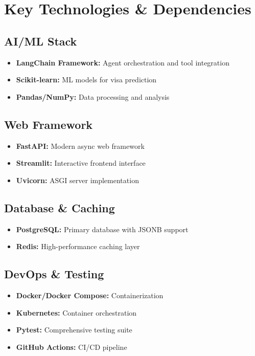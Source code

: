 \documentclass[11pt,a4paper]{article}
\newcommand{\tech}[1]{\textbf{#1}}
\begin{document}
\newpage
\section{Key Technologies \& Dependencies}

\subsection{AI/ML Stack}
\begin{itemize}[itemsep=0.2em]
    \item \tech{LangChain Framework:} Agent orchestration and tool integration
    \item \tech{Scikit-learn:} ML models for visa prediction
    \item \tech{Pandas/NumPy:} Data processing and analysis
\end{itemize}

\subsection{Web Framework}
\begin{itemize}[itemsep=0.2em]
    \item \tech{FastAPI:} Modern async web framework
    \item \tech{Streamlit:} Interactive frontend interface
    \item \tech{Uvicorn:} ASGI server implementation
\end{itemize}

\subsection{Database \& Caching}
\begin{itemize}[itemsep=0.2em]
    \item \tech{PostgreSQL:} Primary database with JSONB support
    \item \tech{Redis:} High-performance caching layer
\end{itemize}

\subsection{DevOps \& Testing}
\begin{itemize}[itemsep=0.2em]
    \item \tech{Docker/Docker Compose:} Containerization
    \item \tech{Kubernetes:} Container orchestration
    \item \tech{Pytest:} Comprehensive testing suite
    \item \tech{GitHub Actions:} CI/CD pipeline
\end{itemize}
\end{document}
